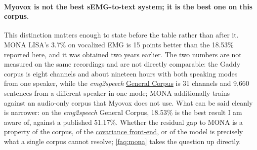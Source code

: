 \documentclass{article}
\DeclareRobustCommand{\glref}[2]{\hyperlink{gl:#1}{\textcolor{glosslink}{#2}}}
\begin{document}
\paragraph{Myovox is not the best sEMG-to-text system; it is the best one on this corpus.}
This distinction matters enough to state before the table rather than after it. MONA LISA's 3.7\% on
vocalized EMG is 15 points better than the 18.53\% reported here, and it was obtained two years
earlier. The two numbers are not measured on the same recordings and are not directly comparable: the
Gaddy corpus is eight channels and about nineteen hours with both speaking modes from one speaker,
while the \emph{emg2speech} \glref{corpus}{General Corpus} is 31 channels and 9{,}660 sentences from a
different speaker in one mode; MONA additionally trains against an audio-only corpus that Myovox does
not use. What can be said cleanly is narrower: on the \emph{emg2speech} General Corpus, 18.53\% is the
best result I am aware of, against a published 51.17\%. Whether the residual gap to MONA is a property
of the corpus, of the \glref{cov}{covariance front-end}, or of the model is precisely what a single
corpus cannot resolve; \ref{faq:mona} takes the question up directly.
\end{document}
